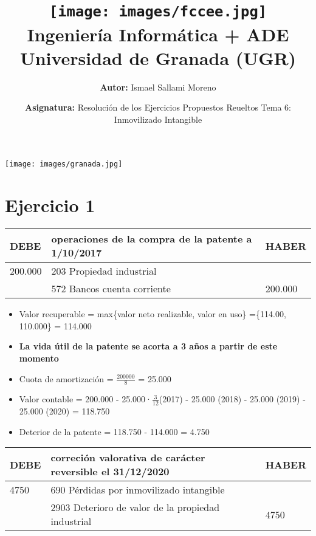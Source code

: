 \documentclass[a4paper,12pt]{article}
\title{
    \vspace{-2cm}
    \texttt{[image: images/fccee.jpg]} \\ %
    \LARGE Ingeniería Informática + ADE\\
    \large Universidad de Granada (UGR)\\[1cm]
}
\author{\textbf{Autor:} Ismael Sallami Moreno}
\date{\textbf{Asignatura:} Resolución de los Ejercicios Propuestos Reueltos Tema 6: Inmovilizado Intangible
}
\newcommand{\valorrecuperable}{Valor recuperable = max\{valor neto realizable, valor en uso\} =}
\newcommand{\VC}{Valor contable = }
\newcommand{\bancos}{572 Bancos cuenta corriente}
\newcommand{\cuotaamort}{Cuota de amortización = }
\newcommand{\myequation}[2]{\ensuremath{\frac{#1}{#2}}}
\begin{document}
\maketitle
\thispagestyle{empty}

\begin{center}
    \texttt{[image: images/granada.jpg]} \\ %
    \vfill
\end{center}

\newpage

\tableofcontents
\newpage

\section{Ejercicio 1}

\begin{table}[H]
    \centering
    \begin{tabular}{|p{3cm}|p{6cm}|p{3cm}|}
    \hline
    \textbf{DEBE} & \textbf{operaciones de la compra de la patente a 1/10/2017} & \textbf{HABER} \\
    \hline
    200.000 & 203  Propiedad industrial & \\
    \hline
    & \bancos & 200.000\\
    \hline
    \end{tabular}
\end{table}

\begin{itemize}
    \item \valorrecuperable \{114.00, 110.000\} = 114.000
    \item \textbf{La vida útil de la patente se acorta a 3 años a partir de este momento}
    \item \cuotaamort \myequation{200000}{8} = 25.000
    \item \VC 200.000 - 25.000·\myequation{3}{12}(2017) - 25.000 (2018) - 25.000 (2019) - 25.000 (2020) = 118.750
    \item Deterior de la patente = 118.750 - 114.000 = 4.750
\end{itemize}

\begin{table}[H]
    \centering
    \begin{tabular}{|p{3cm}|p{6cm}|p{3cm}|}
    \hline
    \textbf{DEBE} & \textbf{correción valorativa de carácter reversible el 31/12/2020} & \textbf{HABER} \\
    \hline
    4750& 690 Pérdidas por inmovilizado intangible& \\
    \hline
    & 2903 Deterioro de valor de la propiedad industrial&4750 \\
    \hline
    \end{tabular}
\end{table}
\end{document}
